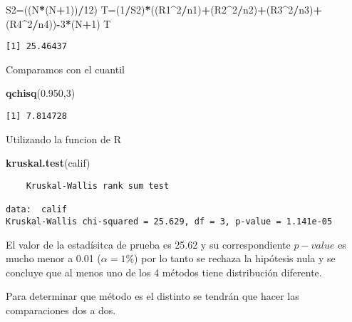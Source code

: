 \documentclass[
  a4paper,
  oneside,
  openany]{book}
\newenvironment{Shaded}{\begin{snugshade}}{\end{snugshade}}
\newcommand{\DecValTok}[1]{\textcolor[rgb]{0.00,0.00,0.81}{#1}}
\newcommand{\FloatTok}[1]{\textcolor[rgb]{0.00,0.00,0.81}{#1}}
\newcommand{\KeywordTok}[1]{\textcolor[rgb]{0.13,0.29,0.53}{\textbf{#1}}}
\newcommand{\NormalTok}[1]{#1}
\newcommand{\OperatorTok}[1]{\textcolor[rgb]{0.81,0.36,0.00}{\textbf{#1}}}
\begin{document}
\begin{Shaded}
\begin{Highlighting}[]
\NormalTok{S2=((N}\OperatorTok{*}\NormalTok{(N}\OperatorTok{+}\DecValTok{1}\NormalTok{))}\OperatorTok{/}\DecValTok{12}\NormalTok{)}
\NormalTok{T=(}\DecValTok{1}\OperatorTok{/}\NormalTok{S2)}\OperatorTok{*}\NormalTok{((R1}\OperatorTok{\^{}}\DecValTok{2}\OperatorTok{/}\NormalTok{n1)}\OperatorTok{+}\NormalTok{(R2}\OperatorTok{\^{}}\DecValTok{2}\OperatorTok{/}\NormalTok{n2)}\OperatorTok{+}\NormalTok{(R3}\OperatorTok{\^{}}\DecValTok{2}\OperatorTok{/}\NormalTok{n3)}\OperatorTok{+}\NormalTok{(R4}\OperatorTok{\^{}}\DecValTok{2}\OperatorTok{/}\NormalTok{n4))}\OperatorTok{{-}}\DecValTok{3}\OperatorTok{*}\NormalTok{(N}\OperatorTok{+}\DecValTok{1}\NormalTok{)}
\NormalTok{T}
\end{Highlighting}
\end{Shaded}

\begin{verbatim}
[1] 25.46437
\end{verbatim}

Comparamos con el cuantil

\begin{Shaded}
\begin{Highlighting}[]
\KeywordTok{qchisq}\NormalTok{(}\FloatTok{0.950}\NormalTok{,}\DecValTok{3}\NormalTok{)}
\end{Highlighting}
\end{Shaded}

\begin{verbatim}
[1] 7.814728
\end{verbatim}

Utilizando la funcion de R

\begin{Shaded}
\begin{Highlighting}[]
\KeywordTok{kruskal.test}\NormalTok{(calif)}
\end{Highlighting}
\end{Shaded}

\begin{verbatim}
    Kruskal-Wallis rank sum test

data:  calif
Kruskal-Wallis chi-squared = 25.629, df = 3, p-value = 1.141e-05
\end{verbatim}

El valor de la estadísitca de prueba es 25.62 y su correspondiente \(p-value\) es mucho menor a 0.01 (\(\alpha=1\%\)) por lo tanto se rechaza la hipótesis nula y se concluye que al menos uno de los 4 métodos tiene distribución diferente.

Para determinar que método es el distinto se tendrán que hacer las comparaciones dos a dos.
\end{document}
